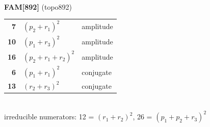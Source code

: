 \documentclass[10pt]{article}
\begin{document}
\begin{minipage}[t]{0.48\textwidth}
{}\\[2mm]\textbf{FAM[892]} (topo892)\\[2pt]{\footnotesize\begin{tabular}{@{}r@{\ \ }l@{\ \ }l@{}}\textbf{7} & $(p_2+r_1)^2$ & amplitude\\
\textbf{10} & $(p_1+r_3)^2$ & amplitude\\
\textbf{16} & $(p_2+r_1+r_2)^2$ & amplitude\\
\textbf{6} & $(p_1+r_1)^2$ & conjugate\\
\textbf{13} & $(r_2+r_3)^2$ & conjugate\\\end{tabular}}\\[2pt]{\scriptsize irreducible numerators: 12 = $(r_1+r_2)^2$, 26 = $(p_1+p_2+r_3)^2$}\end{minipage}

\bigskip
\end{document}
